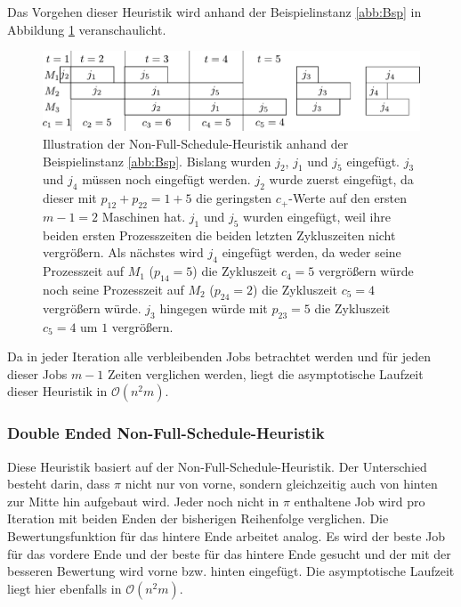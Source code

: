 \documentclass{scrreprt}
\begin{document}
Das Vorgehen dieser Heuristik wird anhand der Beispielinstanz \ref{abb:Bsp} in Abbildung \ref{abb:nfsbsp} veranschaulicht.
\begin{figure}
    \begin{center}
        \includegraphics[width=.8\textwidth]{graphics/nfsbsp.pdf}
    \end{center}
    \caption{
        \label{abb:nfsbsp}
        Illustration der Non-Full-Schedule-Heuristik anhand der Beispielinstanz \ref{abb:Bsp}.
        Bislang wurden $j_2$, $j_1$ und $j_5$ eingefügt. $j_3$ und $j_4$ müssen noch eingefügt werden.
        $j_2$ wurde zuerst eingefügt, da dieser mit $p_{12}+p_{22}=1+5$ die geringsten $c_+$-Werte auf den ersten $m-1=2$ Maschinen hat.
        $j_1$ und $j_5$ wurden eingefügt, weil ihre beiden ersten Prozesszeiten die beiden letzten Zykluszeiten nicht vergrößern.
        Als nächstes wird $j_4$ eingefügt werden, da weder seine Prozesszeit auf $M_1$ ($p_{14}=5$) die Zykluszeit $c_4=5$ vergrößern würde
        noch seine Prozesszeit auf $M_2$ ($p_{24}=2$) die Zykluszeit $c_5=4$ vergrößern würde.
        $j_3$ hingegen würde mit $p_{23}=5$ die Zykluszeit $c_5=4$ um $1$ vergrößern.
    }
\end{figure}

Da in jeder Iteration alle verbleibenden Jobs betrachtet werden und für jeden dieser Jobs $m-1$ Zeiten verglichen werden,
liegt die asymptotische Laufzeit dieser Heuristik in $\mathcal{O}(n^2m)$.

\subsubsection{Double Ended Non-Full-Schedule-Heuristik}
Diese Heuristik basiert auf der Non-Full-Schedule-Heuristik.
Der Unterschied besteht darin, dass $\pi$ nicht nur von vorne, sondern gleichzeitig auch von hinten zur Mitte hin aufgebaut wird.
Jeder noch nicht in $\pi$ enthaltene Job wird pro Iteration mit beiden Enden der bisherigen Reihenfolge verglichen.
Die Bewertungsfunktion für das hintere Ende arbeitet analog.
Es wird der beste Job für das vordere Ende und der beste für das hintere Ende gesucht und der mit der besseren Bewertung wird vorne bzw. hinten eingefügt.
Die asymptotische Laufzeit liegt hier ebenfalls in $\mathcal{O}(n^2m)$.
\end{document}
